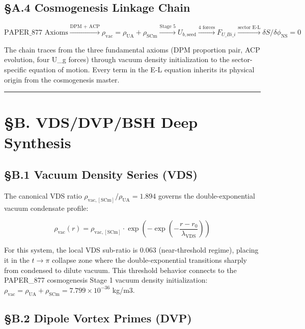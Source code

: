 \documentclass[12pt,a4paper]{article}
\begin{document}
\subsection{\S{}A.4 Cosmogenesis Linkage Chain}

\begin{equation}
\text{PAPER\_877 Axioms} \xrightarrow{\text{DPM + ACP}} \rho_{\mathrm{vac}} = \rho_{\mathrm{UA}} + \rho_{\mathrm{SCm}} \xrightarrow{\text{Stage 5}} U_{b,\mathrm{seed}} \xrightarrow{\text{4 forces}} F_{U\_Bi\_i} \xrightarrow{\text{sector E-L}} \delta S/\delta \phi_{\mathrm{NS}} = 0
\end{equation}

The chain traces from the three fundamental axioms (DPM proportion pair, ACP evolution, four U\_g forces) through vacuum density initialization to the sector-specific equation of motion. Every term in the E-L equation inherits its physical origin from the cosmogenesis master.

\medskip\hrule\medskip

\section{\S{}B. VDS/DVP/BSH Deep Synthesis}

\subsection{\S{}B.1 Vacuum Density Series (VDS)}

The canonical VDS ratio $\rho_{\mathrm{vac,[SCm]}} / \rho_{\mathrm{UA}} = 1.894$ governs the double-exponential vacuum condensate profile:

\begin{equation}
\rho_{\mathrm{vac}}(r) = \rho_{\mathrm{vac,[SCm]}} \cdot \exp\!\left(-\exp\!\left(-\frac{r - r_0}{\lambda_{\mathrm{VDS}}}\right)\right)
\end{equation}

For this system, the local VDS sub-ratio is $0.063$ (near-threshold regime), placing it in the $t \to \pi$ collapse zone where the double-exponential transitions sharply from condensed to dilute vacuum. This threshold behavior connects to the PAPER\_877 cosmogenesis Stage 1 vacuum density initialization: $\rho_{\mathrm{vac}} = \rho_{\mathrm{UA}} + \rho_{\mathrm{SCm}} = 7.799 \times 10^{-36}$ kg/m3.

\subsection{\S{}B.2 Dipole Vortex Primes (DVP)}
\end{document}
